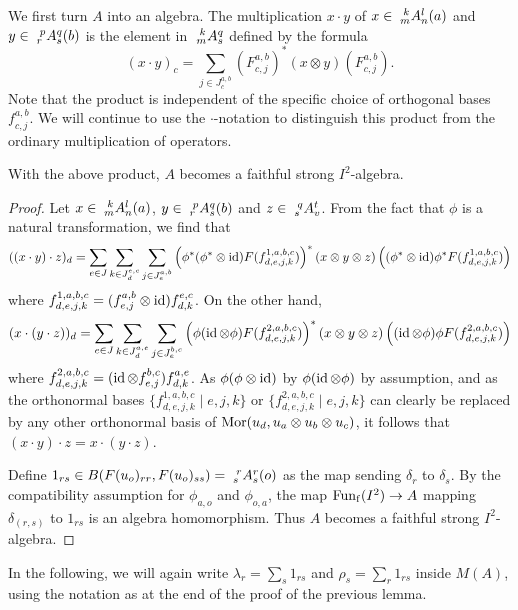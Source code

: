 We first turn $A$ into an algebra. The multiplication $x\cdot y$ of $x\in \Gr{A}{k}{l}{m}{n}(a)$ and $y\in \Gr{A}{p}{q}{r}{s}(b)$ is the element in $\Gr{A}{k}{q}{m}{s}$ defined by the formula \[(x\cdot y)_c = \sum_{j\in J^{a,b}_c} \left(F^{a,b}_{c,j}\right)^*(x\otimes y)\left( F^{a,b}_{c,j}\right).\] Note that the product is independent of the specific choice of orthogonal bases $f^{a,b}_{c,j}$. We will continue to use the $\cdot$-notation to distinguish this product from the ordinary multiplication of operators.

\begin{Lem} With the above product, $A$ becomes a faithful strong $I^2$-algebra.
\end{Lem}

\begin{proof} Let $x\in \Gr{A}{k}{l}{m}{n}(a)$, $y\in \Gr{A}{p}{q}{r}{s}(b)$ and $z\in \Gr{A}{q}{t}{s}{v}$. From the fact that $\phi$ is a natural transformation, we find that \[((x\cdot y)\cdot z)_d = \sum_{e\in J}\sum_{k\in J_d^{e,c}}\sum_{j\in J_e^{a,b}} \left(\phi^*(\phi^*\otimes \id)F(f_{d,e,j,k}^{1,a,b,c})\right)^*(x\otimes y\otimes z)\left((\phi^*\otimes \id)\phi^* F(f_{d,e,j,k}^{1,a,b,c})\right)\] where $f_{d,e,j,k}^{1,a,b,c}=(f_{e,j}^{a,b}\otimes \id)f_{d,k}^{e,c}$. On the other hand, \[(x\cdot (y\cdot z))_d = \sum_{e\in J}\sum_{k\in J_d^{a,e}}\sum_{j\in J_e^{b,c}} \left(\phi(\id\otimes \phi)F(f_{d,e,j,k}^{2,a,b,c})\right)^*(x\otimes y\otimes z)\left((\id\otimes \phi)\phi F(f_{d,e,j,k}^{2,a,b,c})\right)\] where $f_{d,e,j,k}^{2,a,b,c} = (\id\otimes f_{e,j}^{b,c})f_{d,k}^{a,e}$. As $\phi(\phi\otimes \id)$ by $\phi(\id\otimes \phi)$ by assumption, and as the orthonormal bases $\{f_{d,e,j,k}^{1,a,b,c}\mid e,j,k\}$ or $\{f^{2,a,b,c}_{d,e,j,k}\mid e,j,k\}$ can clearly be replaced by any other orthonormal basis of $\Mor(u_d,u_a\otimes u_b\otimes u_c)$, it follows that $(x\cdot y)\cdot z = x\cdot (y\cdot z)$.

Define $1_{rs} \in B(F(u_o)_{rr},F(u_o)_{ss}) = \Gr{A}{r}{r}{s}{s}(o)$ as the map sending $\delta_r$ to $\delta_s$. By the compatibility assumption for $\phi_{a,o}$ and $\phi_{o,a}$, the map $\Ff(I^2)\rightarrow A$ mapping $\delta_{(r,s)}$ to $1_{rs}$ is an algebra homomorphism. Thus $A$ becomes a faithful strong $I^2$-algebra.
\end{proof}

In the following, we will again write $\lambda_r = \sum_s 1_{rs}$ and $\rho_s = \sum_r 1_{rs}$ inside $M(A)$, using the notation as at the end of the proof of the previous lemma.


